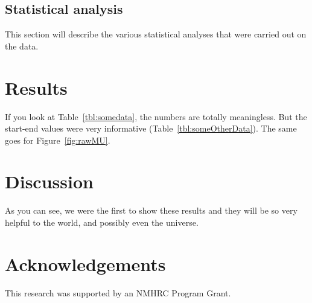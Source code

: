 \documentclass[letterpaper,12pt]{article}
\begin{document}
\subsection*{Statistical analysis}

This section will describe the various statistical analyses that were carried out on the data.


\section*{Results}

If you look at Table~\ref{tbl:somedata}, the numbers are totally meaningless. 
But the start-end values were very informative (Table~\ref{tbl:someOtherData}). 
The same goes for Figure~\ref{fig:rawMU}.

\lipsum[1]


\section*{Discussion}

As you can see, we were the first to show these results and they will be so very helpful to the world, and possibly even the universe.

\lipsum[1-3]


\newpage
\section*{Acknowledgements}

This research was supported by an NMHRC Program Grant.


\newpage



\end{document}
